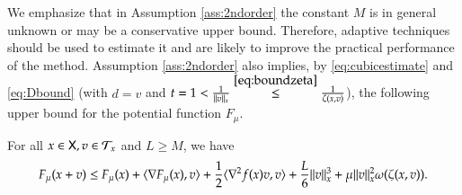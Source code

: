 We emphasize that in Assumption \ref{ass:2ndorder} the constant $M$ is in general unknown or may be a conservative upper bound. Therefore, adaptive techniques should be used to estimate it and are likely to improve the practical performance of the method. Assumption \ref{ass:2ndorder} also implies, by \eqref{eq:cubicestimate} and \eqref{eq:Dbound} (with $d=v$ and $t=1< \frac{1}{\lVert v\rVert_x} \stackrel{\eqref{eq:boundzeta}}{\leq} \frac{1}{\zeta(x,v)}$), the following upper bound for the potential function $F_{\mu}$. 
\begin{lemma}
\label{lem:cubic}
For all $x\in\mathsf{X},v\in\mathcal{T}_{x}$ and $L\geq M$, we have 
\begin{equation}\label{eq:cubicdecrease}
F_{\mu}(x+v)\leq F_{\mu}(x)+\langle\nabla F_{\mu}(x),v\rangle+\frac{1}{2}\langle\nabla^{2}f(x)v,v\rangle+\frac{L}{6}\lVert v\rVert^{3}_{x}+\mu\lVert v\rVert^{2}_{x}\omega(\zeta(x,v)).
\end{equation}
\end{lemma}

